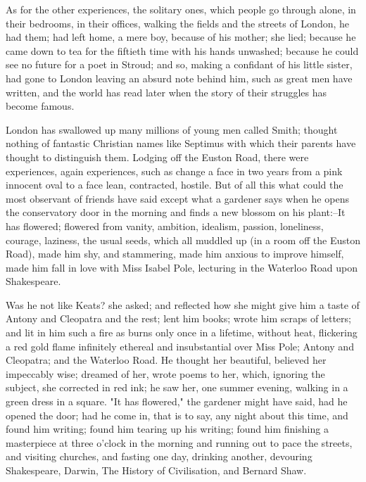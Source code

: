 \documentclass[lang=cn,10pt]{elegantbook}
\begin{document}
As for the other experiences, the solitary ones, which people go
through alone, in their bedrooms, in their offices, walking the
fields and the streets of London, he had them; had left home, a
mere boy, because of his mother; she lied; because he came down to
tea for the fiftieth time with his hands unwashed; because he could
see no future for a poet in Stroud; and so, making a confidant of
his little sister, had gone to London leaving an absurd note behind
him, such as great men have written, and the world has read later
when the story of their struggles has become famous.

London has swallowed up many millions of young men called Smith;
thought nothing of fantastic Christian names like Septimus with
which their parents have thought to distinguish them.  Lodging off
the Euston Road, there were experiences, again experiences, such as
change a face in two years from a pink innocent oval to a face
lean, contracted, hostile.  But of all this what could the most
observant of friends have said except what a gardener says when he
opens the conservatory door in the morning and finds a new blossom
on his plant:--It has flowered; flowered from vanity, ambition,
idealism, passion, loneliness, courage, laziness, the usual seeds,
which all muddled up (in a room off the Euston Road), made him shy,
and stammering, made him anxious to improve himself, made him fall
in love with Miss Isabel Pole, lecturing in the Waterloo Road upon
Shakespeare.

Was he not like Keats? she asked; and reflected how she might give
him a taste of Antony and Cleopatra and the rest; lent him books;
wrote him scraps of letters; and lit in him such a fire as burns
only once in a lifetime, without heat, flickering a red gold flame
infinitely ethereal and insubstantial over Miss Pole; Antony and
Cleopatra; and the Waterloo Road.  He thought her beautiful,
believed her impeccably wise; dreamed of her, wrote poems to her,
which, ignoring the subject, she corrected in red ink; he saw her,
one summer evening, walking in a green dress in a square.  "It has
flowered," the gardener might have said, had he opened the door;
had he come in, that is to say, any night about this time, and
found him writing; found him tearing up his writing; found him
finishing a masterpiece at three o'clock in the morning and running
out to pace the streets, and visiting churches, and fasting one
day, drinking another, devouring Shakespeare, Darwin, The History
of Civilisation, and Bernard Shaw.
\end{document}
